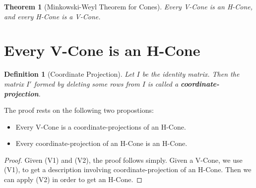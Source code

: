 \documentclass[fleqn]{article}
\newcommand{\0}{\vec{0}}
\newtheorem{Def}{Definition}
\newtheorem{Thm}{Theorem}
\newcommand{\MWT}{Minkowski-Weyl Theorem }
\begin{document}
\begin{Thm}[\MWT for Cones]{
  Every V-Cone is an H-Cone, and every H-Cone is a V-Cone.
}\end{Thm}

\newcommand{\Vcomp}{(V1)}
\newcommand{\Vproj}{(V2)}

\section{Every V-Cone is an H-Cone}

\begin{Def}[Coordinate Projection]{
  Let $I$ be the identity matrix.  Then the matrix $I'$ formed by deleting some rows from $I$ is called a \textbf{coordinate-projection}.
}\end{Def}

  The proof rests on the following two propostions:
  \begin{itemize}
  \item[\Vcomp] Every V-Cone is a coordinate-projections of an H-Cone.
  \item[\Vproj] Every coordinate-projection of an H-Cone is an H-Cone.
  \end{itemize}
\begin{proof}
  Given {\Vcomp} and {\Vproj}, the proof follows simply.  Given a V-Cone, we use {\Vcomp}, to get a description involving coordinate-projection of an H-Cone.  Then we can apply {\Vproj} in order to get an H-Cone.
\end{proof}
\end{document}
